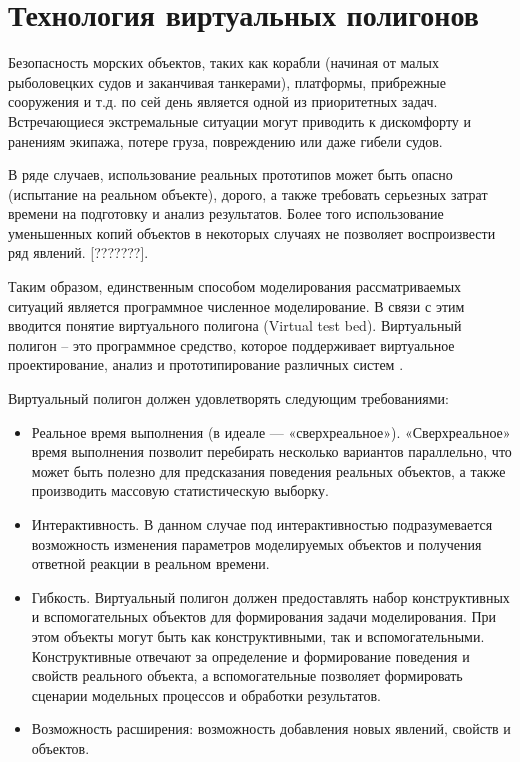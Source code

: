\section{Технология виртуальных полигонов}

Безопасность морских объектов, таких как корабли (начиная от малых рыболовецких судов и заканчивая танкерами), платформы, прибрежные сооружения и т.д. по сей день является одной из приоритетных задач.
Встречающиеся экстремальные ситуации могут приводить к дискомфорту и ранениям экипажа, потере груза, повреждению или даже гибели судов.

В ряде случаев, использование реальных прототипов может быть опасно (испытание на реальном объекте), дорого, а также требовать серьезных затрат времени на подготовку и анализ результатов. Более того использование уменьшенных копий объектов в некоторых случаях не позволяет воспроизвести ряд явлений. [???????].

Таким образом, единственным способом моделирования рассматриваемых ситуаций является программное численное моделирование. В связи с этим вводится понятие виртуального полигона (Virtual test bed).
Виртуальный полигон – это программное средство, которое поддерживает виртуальное проектирование, анализ и прототипирование различных систем \citep{vtb_ship_ee} \citep{vtb_ILRO}. 

Виртуальный полигон должен удовлетворять следующим требованиями:
\begin{itemize}
	\item 	Реальное время выполнения (в идеале --- «сверхреальное»). «Сверхреальное» 
			время выполнения позволит перебирать несколько вариантов параллельно, что может быть полезно для предсказания поведения реальных объектов, а также производить массовую статистическую выборку.
	\item 	Интерактивность. В данном случае под интерактивностью подразумевается 
			возможность изменения параметров моделируемых объектов и получения 
			ответной реакции в реальном времени.
	\item 	Гибкость. Виртуальный полигон должен предоставлять набор конструктивных 
			и вспомогательных объектов для формирования задачи моделирования.  
			При этом объекты могут быть как конструктивными, так и вспомогательными. 
			Конструктивные отвечают за определение и формирование поведения и свойств 
			реального объекта, а вспомогательные позволяет формировать сценарии 
			модельных процессов и обработки результатов.
	\item 	Возможность расширения: возможность добавления новых явлений, свойств и объектов.
\end{itemize}

